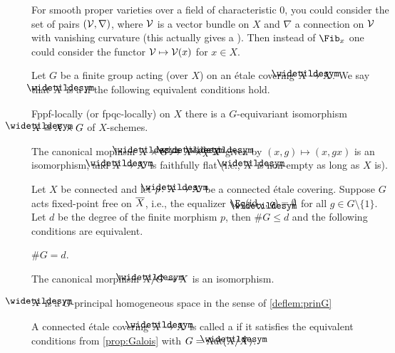 \documentclass[a4paper, 10pt, oneside, DIV=9, chapterprefix=true, numbers=enddot, bibliography=totoc]{scrbook}
\begin{document}
\begin{rem}
	For smooth proper varieties over a field of characteristic $0$, you could consider the set of pairs $(\mathcal{V},\nabla)$, where $\mathcal{V}$ is a vector bundle on $X$ and $\nabla$ a connection on $\mathcal{V}$ with vanishing curvature (this actually gives a ). Then instead of $\Fib_x$ one could consider the functor $\mathcal{V}\mapsto\mathcal{V}(x)$ for $x\in X$.
\end{rem}
\begin{deflem}\label{deflem:prinG}
	Let $G$ be a finite group acting (over $X$) on an étale covering $\snake{X}\morphism X$. We say that $\snake{X}$ is a  if the following equivalent conditions hold.
	\begin{alphanumerate}
		\item Fppf-locally (or fpqc-locally) on $X$ there is a $G$-equivariant isomorphism $\snake{X}\cong X\times G$ of $X$-schemes.
		\item The canonical mophism $\snake{X}\times G\morphism\snake{X}\times_X\snake{X}$ given by $(x,g)\mapsto (x,gx)$ is an isomorphism, and $\snake{X}\morphism X$ is faithfully flat (i.e., $\snake{X}$ is non-empty as long as $X$ is).
	\end{alphanumerate}
\end{deflem}
\begin{prop}\label{prop:Galois}
	Let $X$ be connected and let $p\colon \snake{X}\morphism X$ be a connected étale covering. Suppose $G$ acts fixed-point free on $\ov{X}$, i.e., the equalizer $\Eq(\id_{\snake{X}},g)=\emptyset$ for all $g\in G\setminus\{1\}$. Let $d$ be the degree of the finite morphism $p$, then $\# G\leq d$ and the following conditions are equivalent.
	\begin{alphanumerate}
		\item $\# G=d$.
		\item The canonical morphism $\snake{X}/G\morphism X$ is an isomorphism.
		\item $\snake{X}$ is a $G$-principal homogeneous space in the sense of \cref{deflem:prinG}
	\end{alphanumerate}
\end{prop}
\begin{defi}\label{def:Galois}
	A connected étale covering $\snake{X}\morphism X$ is called a  if it satisfies the equivalent conditions from \cref{prop:Galois} with $G=\Aut(\snake{X}/X)$.
\end{defi}
\end{document}
